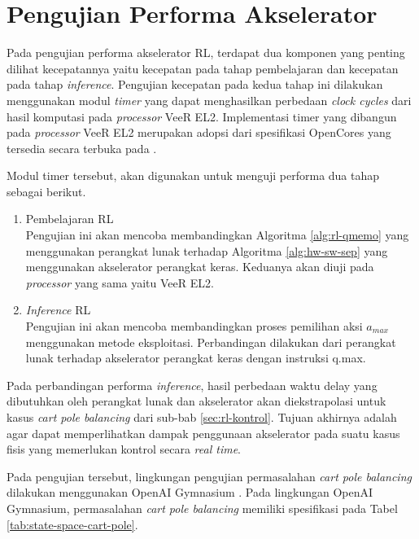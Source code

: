 \section{Pengujian Performa Akselerator}
\label{sec:pengujian-performa-akselerator}

Pada pengujian performa akselerator \ac{RL}, terdapat dua komponen yang penting dilihat kecepatannya yaitu kecepatan pada tahap pembelajaran dan kecepatan pada tahap \textit{inference}. Pengujian kecepatan pada kedua tahap ini dilakukan menggunakan modul \textit{timer} yang dapat menghasilkan perbedaan \textit{clock cycles} dari hasil komputasi pada \textit{processor} VeeR EL2. Implementasi timer yang dibangun pada \textit{processor} VeeR EL2 merupakan adopsi dari spesifikasi OpenCores yang tersedia secara terbuka pada \parencite{open2024ptc}.

Modul timer tersebut, akan digunakan untuk menguji performa dua tahap sebagai berikut.

\begin{enumerate}
	\item Pembelajaran \acl{RL}\\
	      Pengujian ini akan mencoba membandingkan Algoritma \ref{alg:rl-qmemo} yang menggunakan perangkat lunak terhadap Algoritma \ref{alg:hw-sw-sep} yang menggunakan akselerator perangkat keras. Keduanya akan diuji pada \textit{processor} yang sama yaitu VeeR EL2.
	\item \textit{Inference} \acl{RL}\\
	      Pengujian ini akan mencoba membandingkan proses pemilihan aksi $a_{max}$ menggunakan metode eksploitasi. Perbandingan dilakukan dari perangkat lunak terhadap akselerator perangkat keras dengan instruksi q.max.
\end{enumerate}

Pada perbandingan performa \textit{inference}, hasil perbedaan waktu delay yang dibutuhkan oleh perangkat lunak dan akselerator akan diekstrapolasi untuk kasus \textit{cart pole balancing} dari sub-bab \ref{sec:rl-kontrol}. Tujuan akhirnya adalah agar dapat memperlihatkan dampak penggunaan akselerator pada suatu kasus fisis yang memerlukan kontrol secara \textit{real time}.

Pada pengujian tersebut, lingkungan pengujian permasalahan \textit{cart pole balancing} dilakukan menggunakan OpenAI Gymnasium \parencite{towers2023gymnasium}. Pada lingkungan OpenAI Gymnasium, permasalahan \textit{cart pole balancing} memiliki spesifikasi pada Tabel \ref{tab:state-space-cart-pole}.

